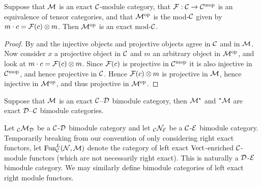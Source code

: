 \documentclass{amsart}
\begin{document}
\begin{lemma}
Suppose that $\mathcal M$ is an exact $\mathcal C$-module category, that $\mathcal F: \mathcal C \rightarrow \mathcal C^{\mathrm{mop}}$ is an equivalence of tensor categories, and that $\mathcal M^{\mathrm{op}}$ is the mod-$\mathcal C$ given by $m \cdot c = \mathcal F(c) \otimes m$.  Then $\mathcal M^{\mathrm{op}}$ is an exact mod-$\mathcal C$.
\end{lemma}
\begin{proof}
By \cite[Prop. 2.3]{EO-ftc} and \cite[Corollary 3.6]{EO-ftc} the injective objects and projective objects agree in $\mathcal C$ and in $\mathcal M$.  Now consider $x$ a projective object in $\mathcal C$ and $m$ an arbitrary object in $\mathcal M^{\mathrm{op}}$, and look at $m \cdot c = \mathcal F(c) \otimes m$.  Since $\mathcal F(c)$ is projective in $\mathcal C^{\mathrm{mop}}$ it is also injective in $\mathcal C^{\mathrm{mop}}$, and hence projective in $\mathcal C$.  Hence $\mathcal F(c) \otimes m$ is projective in $\mathcal M$, hence injective in $\mathcal M^{\mathrm{op}}$, and thus projective in $\mathcal M^{\mathrm{op}}$.
\end{proof}

\begin{corollary} \label{cor:adjoint-exactness}
Suppose that $\mathcal M$ is an exact $\mathcal C$--$\mathcal D$ bimodule category, then $\mathcal M^*$ and ${}^*\mathcal M$ are exact $\mathcal D$--$\mathcal C$ bimodule categories.
\end{corollary}


\begin{definition}
	Let ${}_{\mathcal C}\mathcal M_\mathcal D$ be a $\mathcal C$-$\mathcal D$ bimodule category and let ${}_{\mathcal C}\mathcal N_\mathcal E$ be a $\mathcal C$-$\mathcal E$ bimodule category. Temporarily breaking from our convention of only considering right exact functors, let	 $\operatorname{Fun}^L_{\mathcal C}(\mathcal N, \mathcal M)$ denote the category of left exact $\mathrm{Vect}$-enriched $\mathcal C$-module functors (which are not necessarily right exact). This is naturally a $\mathcal D$-$\mathcal E$ bimodule category. We may similarly define bimodule categories of left exact right module functors. 
\end{definition}
\end{document}
